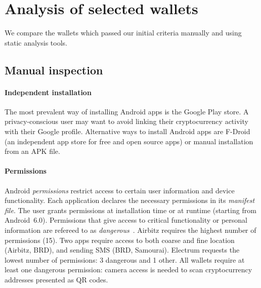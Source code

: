 \section{Analysis of selected wallets} \label{section:Ch04_Analysis}

We compare the wallets which passed our initial criteria manually and using static analysis tools.

\subsection{Manual inspection}

\paragraph{Independent installation}
The most prevalent way of installing Android apps is the Google Play store.
A privacy-conscious user may want to avoid linking their cryptocurrency activity with their Google profile.
Alternative ways to install Android apps are F-Droid (an independent app store for free and open source apps) or manual installation from an APK file.

\paragraph{Permissions}
Android \textit{permissions} restrict access to certain user information and device functionality.
Each application declares the necessary permissions in its \textit{manifest file}.
The user grants permissions at installation time or at runtime (starting from Android~6.0).
Permissions that give access to critical functionality or personal information are refereed to as \textit{dangerous}~\cite{Android}.
Airbitz requires the highest number of permissions (15).
Two apps require access to both coarse and fine location (Airbitz, BRD), and sending SMS (BRD, Samourai).
Electrum requests the lowest number of permissions: 3 dangerous and 1 other.
All wallets require at least one dangerous permission: camera access is needed to scan cryptocurrency addresses presented as QR codes.


